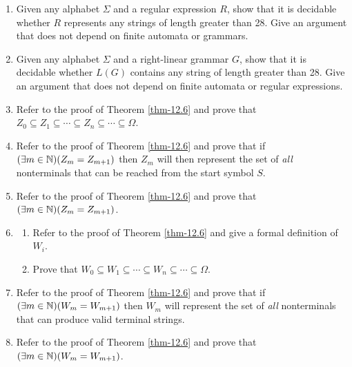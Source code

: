 \begin{enumerate}[{12.}1.]
\item Given any alphabet $\Sigma$ and a regular expression $R$, show that it is
decidable whether $R$ represents any strings of length greater than 28. Give an
argument that does not depend on finite automata or grammars.

\item Given any alphabet $\Sigma$ and a right-linear grammar $G$, show that it
is decidable whether $L(G)$ contains any string of length greater than 28. Give
an argument that does not depend on finite automata or regular expressions.

\item Refer to the proof of Theorem \ref{thm-12.6} and prove that $Z_0\subseteq
Z_1\subseteq\cdots\subseteq Z_n\subseteq\cdots\subseteq\Omega$.

\item Refer to the proof of Theorem \ref{thm-12.6} and prove that if $(\exists m
\in\mathbb{N})(Z_m=Z_{m+1})$ then $Z_m$ will then represent the set of \emph{all}
nonterminals that can be reached from the start symbol $S$.

\item Refer to the proof of Theorem \ref{thm-12.6} and prove that $(\exists m\in
\mathbb{N})(Z_m=Z_{m+1})$.

\item \begin{enumerate}
\item Refer to the proof of Theorem \ref{thm-12.6} and give a formal definition
of $W_i$.
\item Prove that $W_0\subseteq W_1\subseteq\cdots\subseteq W_n\subseteq\cdots
\subseteq\Omega$.
\end{enumerate}

\item Refer to the proof of Theorem \ref{thm-12.6} and prove that if $(\exists m
\in\mathbb{N})(W_m=W_{m+1})$ then $W_m$ will represent the set of \emph{all}
nonterminals that can produce valid terminal strings.

\item Refer to the proof of Theorem \ref{thm-12.6} and prove that $(\exists m\in
\mathbb{N})(W_m=W_{m+1})$.


\end{enumerate}
